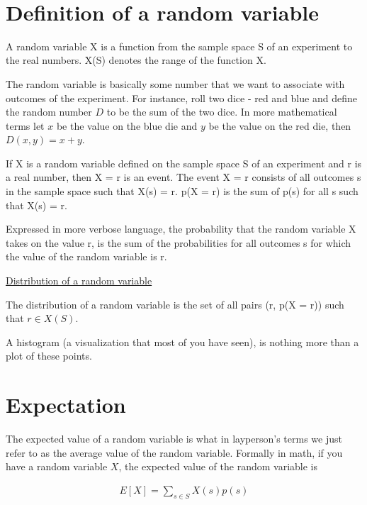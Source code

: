 \documentclass[12pt]{article}
\begin{document}
\begin{center}
\\
\vspace{1cm}
\end{center}

\vspace{0.5cm}\noindent


\section*{Definition of a random variable}
A random variable X is a function from the sample space S of an experiment to the real numbers. X(S) denotes the range of the function X. 

The random variable is basically some number that we want to associate with outcomes of the experiment. For instance, roll two dice - red and blue and define the random number $D$ to be the sum of the two dice. In more mathematical terms let $x$ be the value on the blue die and $y$ be the value on the red die, then $D(x,y) = x+y$.

If X is a random variable defined on the sample space S of an experiment and r is a real number, then X = r is an event. The event X = r consists of all outcomes s in the sample space such that X(s) = r. p(X = r) is the sum of p(s) for all s such that X(s) = r. 

Expressed in more verbose language, the probability that the random variable X takes on the value r, is the sum of the probabilities for all outcomes s for which the value of the random variable is r. 

\underline{Distribution of a random variable}

The distribution of a random variable is the set of all pairs (r, p(X = r)) such that $r \in X(S)$.

A histogram (a visualization that most of you have seen), is nothing more than a plot of these points. 

\section*{Expectation}
The expected value of a random variable is what in layperson's terms we just refer to as the average value of the random variable. Formally in math, if you have a random variable $X$, the expected value of the random variable is

\begin{align*}
E[X] = \sum_{s \in S}X(s)p(s)
\end{align*}
\end{document}
